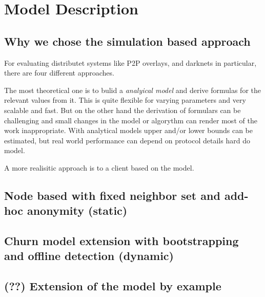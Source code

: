\chapter{Model Description}

\section{Why we chose the simulation based approach}

For evaluating distributet systems like P2P overlays, and darknets in particular, there are four different approaches.

The most theoretical one is to bulid a \emph{analyical model} and derive formulas for the relevant values from it. This is quite flexible for varying parameters and very scalable and fast. But on the other hand the derivation of formulars can be challenging and small changes in the model or algorythm can render most of the work inappropriate. With analytical models upper and/or lower bounds can be estimated, but real world performance can depend on protocol details hard do model.

A more realisitic approach is to  a client based on the model. 


\section{Node based with fixed neighbor set and add-hoc anonymity (static)}



\section{Churn model extension with bootstrapping and offline detection (dynamic)}
\section{(??) Extension of the model by example}
